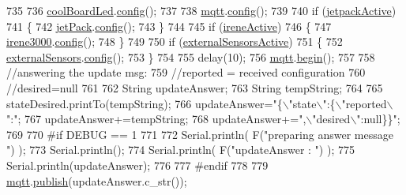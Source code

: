\begin{DoxyCode}
735 
736             \hyperlink{classCoolBoard_a1b1d3c684a5baa56b08486e192fd8e97}{coolBoardLed}.\hyperlink{classCoolBoardLed_a1b60e5e30bea96c49ed62ed1bf1ffc8b}{config}();
737 
738             \hyperlink{classCoolBoard_a2399f44d7c23c1149a335cb3b46d90f1}{mqtt}.\hyperlink{classCoolMQTT_a9b703de4f1358f0ee7a5e8c44979c648}{config}();
739 
740             \textcolor{keywordflow}{if} (\hyperlink{classCoolBoard_a9be03a913d26e558328935ca3b59a75e}{jetpackActive})
741             \{
742                 \hyperlink{classCoolBoard_a30b1357881b01ccbec676856a91e48e9}{jetPack}.\hyperlink{classJetpack_ab065ee83e244265a2223a22f3ee4a719}{config}();
743             \}
744 
745             \textcolor{keywordflow}{if} (\hyperlink{classCoolBoard_a9c3f7ac625481ee2ae802a25d97a4ae0}{ireneActive})
746             \{
747                 \hyperlink{classCoolBoard_ad103718ce316006c4695b8eb312eaf11}{irene3000}.\hyperlink{classIrene3000_afed5c35e4b23963c157847ef27c11e9c}{config}();
748             \}
749 
750             \textcolor{keywordflow}{if} (\hyperlink{classCoolBoard_a638b00b76aeb819ecfd4c10b8cdd7bb7}{externalSensorsActive})
751             \{
752                 \hyperlink{classCoolBoard_a09e26264839c65873eb56af476eff6b2}{externalSensors}.\hyperlink{classExternalSensors_a862a4bd11346b37270d0244c2adabe5a}{config}();
753             \}
754 
755             delay(10);
756             \hyperlink{classCoolBoard_a2399f44d7c23c1149a335cb3b46d90f1}{mqtt}.\hyperlink{classCoolMQTT_ac9248808641ebf3054ed0620ea9d0100}{begin}();
757 
758                 \textcolor{comment}{//answering the update msg:}
759             \textcolor{comment}{//reported = received configuration}
760             \textcolor{comment}{//desired=null}
761         
762             String updateAnswer;
763             String tempString;
764             
765             stateDesired.printTo(tempString);
766             updateAnswer=\textcolor{stringliteral}{"\{\(\backslash\)"state\(\backslash\)":\{\(\backslash\)"reported\(\backslash\)":"};
767             updateAnswer+=tempString;
768             updateAnswer+=\textcolor{stringliteral}{",\(\backslash\)"desired\(\backslash\)":null\}\}"};
769 
770 \textcolor{preprocessor}{        #if DEBUG == 1}
771 
772             Serial.println( F(\textcolor{stringliteral}{"preparing answer message "}) );
773             Serial.println();
774             Serial.println( F(\textcolor{stringliteral}{"updateAnswer : "}) );
775             Serial.println(updateAnswer);
776         
777 \textcolor{preprocessor}{        #endif  }
778 
779             \hyperlink{classCoolBoard_a2399f44d7c23c1149a335cb3b46d90f1}{mqtt}.\hyperlink{classCoolMQTT_ace977b3e90ab14b1199fe5c4fb0a13ec}{publish}(updateAnswer.c\_str());

\end{DoxyCode}
